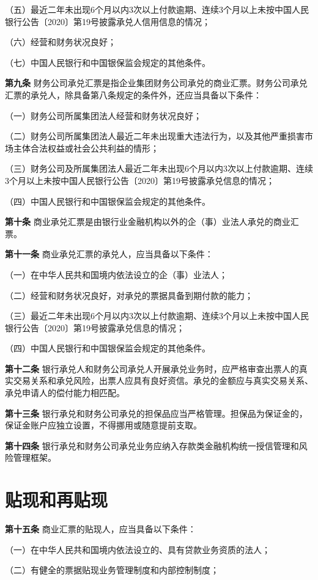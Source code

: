 （五）最近二年未出现6个月以内3次以上付款逾期、连续3个月以上未按中国人民银行公告〔2020〕第19号披露承兑人信用信息的情况；

（六）经营和财务状况良好；

（七）中国人民银行和中国银保监会规定的其他条件。

{\bf 第九条} 财务公司承兑汇票是指企业集团财务公司承兑的商业汇票。财务公司承兑汇票的承兑人，除具备第八条规定的条件外，还应当具备以下条件：

（一）财务公司所属集团法人经营和财务状况良好；

（二）财务公司所属集团法人最近二年未出现重大违法行为，以及其他严重损害市场主体合法权益或社会公共利益的情形；

（三）财务公司及所属集团法人最近二年未出现6个月以内3次以上付款逾期、连续3个月以上未按中国人民银行公告〔2020〕第19号披露承兑信息的情况；

（四）中国人民银行和中国银保监会规定的其他条件。

{\bf 第十条} 商业承兑汇票是由银行业金融机构以外的企（事）业法人承兑的商业汇票。

{\bf 第十一条} 商业承兑汇票的承兑人，应当具备以下条件：

（一）在中华人民共和国境内依法设立的企（事）业法人；

（二）经营和财务状况良好，对承兑的票据具备到期付款的能力；

（三）最近二年未出现6个月以内3次以上付款逾期、连续3个月以上未按中国人民银行公告〔2020〕第19号披露承兑信息的情况；

（四）中国人民银行和中国银保监会规定的其他条件。

{\bf 第十二条} 银行承兑人和财务公司承兑人开展承兑业务时，应严格审查出票人的真实交易关系和承兑风险，出票人应具有良好资信。承兑的金额应与真实交易关系、承兑申请人的偿付能力相匹配。

{\bf 第十三条} 银行承兑和财务公司承兑的担保品应当严格管理。担保品为保证金的，保证金账户应独立设置，不得挪用或随意提前支取。

{\bf 第十四条} 银行承兑和财务公司承兑业务应纳入存款类金融机构统一授信管理和风险管理框架。

\section{贴现和再贴现}

{\bf 第十五条} 商业汇票的贴现人，应当具备以下条件：

（一）在中华人民共和国境内依法设立的、具有贷款业务资质的法人；

（二）有健全的票据贴现业务管理制度和内部控制制度；

